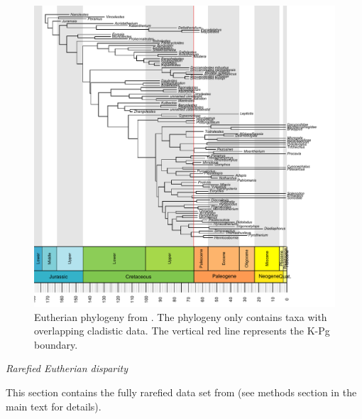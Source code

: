 \documentclass[12pt,letterpaper]{article}
\renewcommand{\subsection}[1]{%
\bigskip
\begin{center}
\begin{large}
\normalfont\itshape #1
\end{large}
\end{center}}
\begin{document}
\begin{figure}[!htbp]
\centering
    \includegraphics[keepaspectratio=true]{Figures/Beck_tree.pdf}
\caption{Eutherian phylogeny from \cite{beckancient2014}. The phylogeny only contains taxa with overlapping cladistic data. The vertical red line represents the K-Pg boundary.}
\end{figure}

\subsection{Rarefied Eutherian disparity}
This section contains the fully rarefied data set from \cite{beckancient2014} (see methods section in the main text for details).
\end{document}
